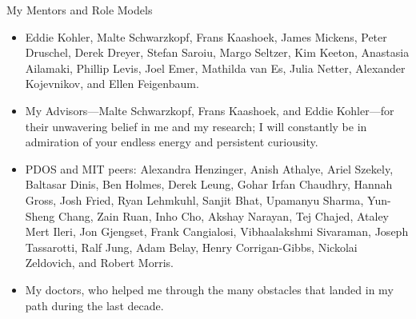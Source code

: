 \begin{center}{My Mentors and Role Models}\end{center} 
    \begin{itemize}
        \item Eddie Kohler, Malte Schwarzkopf, Frans
            Kaashoek, James Mickens, Peter Druschel, Derek Dreyer, Stefan
            Saroiu, Margo Seltzer, Kim Keeton, Anastasia Ailamaki, Phillip
            Levis, Joel Emer, Mathilda van Es, Julia Netter, Alexander
            Kojevnikov, and Ellen
            Feigenbaum.

        \item My Advisors---Malte Schwarzkopf, Frans Kaashoek, and Eddie
            Kohler---for their unwavering belief in me and my research; I will
            constantly be in admiration of your endless energy and persistent
            curiousity.

        \item PDOS and MIT peers: 
            Alexandra Henzinger, Anish Athalye, Ariel Szekely, Baltasar Dinis, Ben Holmes,
            Derek Leung, Gohar Irfan Chaudhry, Hannah Gross, Josh Fried, Ryan
            Lehmkuhl, Sanjit Bhat, Upamanyu Sharma, Yun-Sheng Chang, Zain
            Ruan, Inho Cho,
            Akshay Narayan, Tej Chajed, Ataley Mert Ileri, Jon Gjengset, Frank Cangialosi,
            Vibhaalakshmi Sivaraman, Joseph Tassarotti, Ralf Jung, Adam Belay,
            Henry Corrigan-Gibbs, Nickolai Zeldovich, and Robert Morris.

        \item My doctors, who helped me through the many obstacles that landed in
            my path during the last decade.  
    \end{itemize}
    
